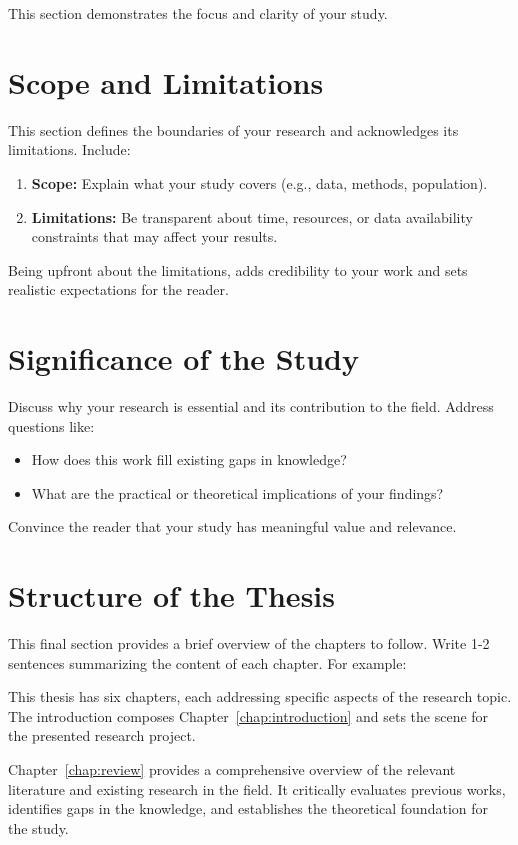 This section demonstrates the focus and clarity of your study.

\section{Scope and Limitations}\label{sec:scope-limitations}
This section defines the boundaries of your research and acknowledges its limitations. Include:
\begin{enumerate}
	\item \textbf{Scope:} Explain what your study covers (e.g., data, methods, population).
	\item \textbf{Limitations:} Be transparent about time, resources, or data availability constraints that may affect your results.
\end{enumerate}

Being upfront about the limitations, adds credibility to your work and sets realistic expectations for the reader.

\section{Significance of the Study}\label{sec:significance}
Discuss why your research is essential and its contribution to the field. Address questions like:
\begin{itemize}
	\item How does this work fill existing gaps in knowledge?
	\item What are the practical or theoretical implications of your findings?
\end{itemize}

Convince the reader that your study has meaningful value and relevance.

\section{Structure of the Thesis}\label{sec:struture-thesis}
This final section provides a brief overview of the chapters to follow. Write 1-2 sentences summarizing the content of each chapter. For example:

This thesis has six chapters, each addressing specific aspects of the research topic. The introduction composes Chapter~\ref{chap:introduction} and sets the scene for the presented research project.

Chapter~\ref{chap:review} provides a comprehensive overview of the relevant literature and existing research in the field. It critically evaluates previous works, identifies gaps in the knowledge, and establishes the theoretical foundation for the study.

